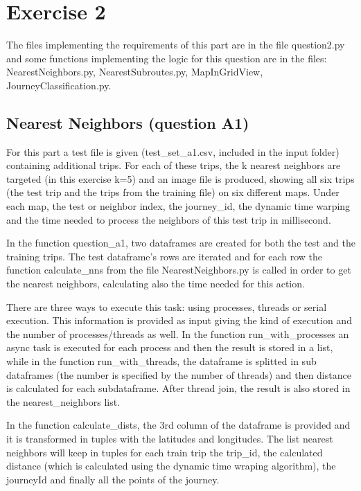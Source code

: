\documentclass[12pt]{article}
\begin{document}
	\section{Exercise 2}
	The files implementing the requirements of this part are in the file question2.py and some functions implementing the logic for this question are in the files: NearestNeighbors.py, NearestSubroutes.py, MapInGridView, JourneyClassification.py.
	
	\subsection{Nearest Neighbors (question A1)}
	For this part a test file is given (test\_set\_a1.csv, included in the input folder) containing additional trips. For each of these trips, the k nearest neighbors are targeted (in this exercise k=5) and an image file is produced, showing all six trips (the test trip and the trips from the training file) on six different maps. Under each map, the test or neighbor index, the journey\_id, the dynamic time warping and the time needed to process the neighbors of this test trip in millisecond.
	
	In the function question\_a1, two dataframes are created for both the test and the training trips. The test dataframe's rows are iterated and for each row the function calculate\_nns from the file NearestNeighbors.py is called in order to get the nearest neighbors, calculating also the time needed for this action.
	
	There are three ways to execute this task: using processes, threads or serial execution. This information is provided as input giving the kind of execution and the number of processes/threads as well. In the function run\_with\_processes an async task is executed for each process and then the result is stored in a list, while in the function run\_with\_threads, the dataframe is splitted in sub dataframes (the number is specified by the number of threads) and then distance is calculated for each subdataframe. After thread join, the result is also stored in the nearest\_neighbors list.
	
	In the function calculate\_dists, the 3rd column of the dataframe is provided and it is transformed in tuples with the latitudes and longitudes. The list nearest neighbors will keep in tuples for each train trip the trip\_id, the calculated distance (which is calculated using the dynamic time wraping algorithm), the journeyId and finally all the points of the journey. 
	
\end{document}
